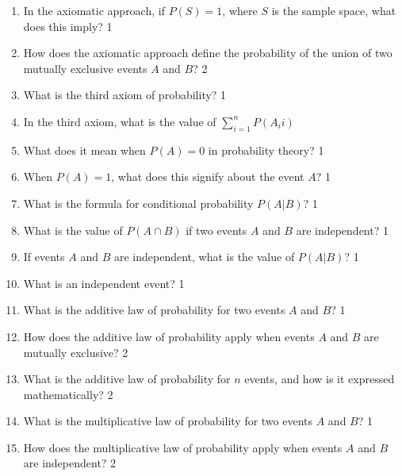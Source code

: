 \documentclass[a4paper,oneside, margin=1.4in]{book}
\begin{document}
\begin{enumerate}
\item In the axiomatic approach, if \( P(S) = 1 \), where \( S \) is the sample space, what does this imply? \hfill 1

\item How does the axiomatic approach define the probability of the union of two mutually exclusive events \( A \) and \( B \)? \hfill 2

\item What is the third axiom of probability? \hfill 1

\item In the third axiom, what is the value of $\displaystyle \sum_{i=1}^n P(A_ii)$

\item What does it mean when \( P(A) = 0 \) in probability theory? \hfill 1

\item When \( P(A) = 1 \), what does this signify about the event \( A \)? \hfill 1

\item What is the formula for conditional probability \( P(A|B) \)? \hfill 1

\item What is the value of $P(A \cap B)$ if two events \( A \) and \( B \) are independent? \hfill 1

\item If events \( A \) and \( B \) are independent, what is the value of \( P(A|B) \)? \hfill 1

\item What is an independent event? \hfill 1

\item What is the additive law of probability for two events \( A \) and \( B \)? \hfill 1

\item How does the additive law of probability apply when events \( A \) and \( B \) are mutually exclusive? \hfill 2

\item What is the additive law of probability for \( n \) events, and how is it expressed mathematically? \hfill 2

\item What is the multiplicative law of probability for two events \( A \) and \( B \)? \hfill 1

\item How does the multiplicative law of probability apply when events \( A \) and \( B \) are independent? \hfill 2


\end{enumerate}
\end{document}
